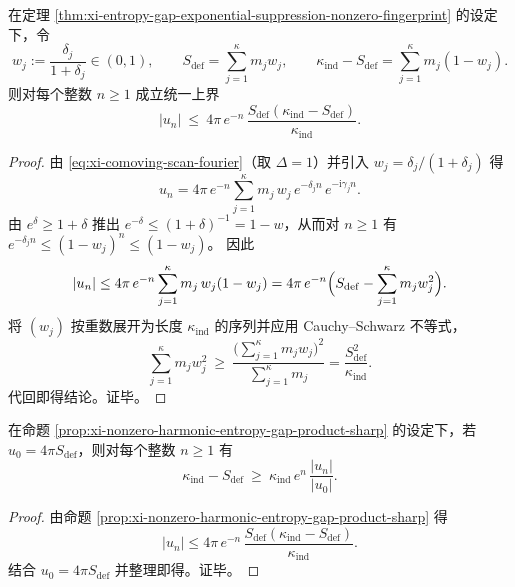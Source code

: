 \begin{proposition}[非零谐波的熵乘积锐化界]\label{prop:xi-nonzero-harmonic-entropy-gap-product-sharp}
在定理 \ref{thm:xi-entropy-gap-exponential-suppression-nonzero-fingerprint} 的设定下，令
\[
w_j:=\frac{\delta_j}{1+\delta_j}\in(0,1),
\qquad
S_{\mathrm{def}}=\sum_{j=1}^{\kappa}m_j w_j,
\qquad
\kappa_{\mathrm{ind}}-S_{\mathrm{def}}=\sum_{j=1}^{\kappa}m_j(1-w_j).
\]
则对每个整数 \(n\ge 1\) 成立统一上界
\[
|u_n|
\ \le\
4\pi\,e^{-n}\,\frac{S_{\mathrm{def}}(\kappa_{\mathrm{ind}}-S_{\mathrm{def}})}{\kappa_{\mathrm{ind}}}.
\]
\end{proposition}
\begin{proof}
由 \eqref{eq:xi-comoving-scan-fourier}（取 \(\Delta=1\)）并引入 \(w_j=\delta_j/(1+\delta_j)\) 得
\[
u_n
=4\pi\,e^{-n}\sum_{j=1}^{\kappa}m_j\,w_j\,e^{-\delta_j n}\,e^{-\mathrm{i}\gamma_j n}.
\]
由 \(e^\delta\ge 1+\delta\) 推出 \(e^{-\delta}\le (1+\delta)^{-1}=1-w\)，从而对 \(n\ge 1\) 有
\(
e^{-\delta_j n}\le (1-w_j)^n\le (1-w_j)
\)。
因此
\[
|u_n|
\le
4\pi\,e^{-n}\sum_{j=1}^{\kappa}m_j\,w_j(1-w_j)
=
4\pi\,e^{-n}\Bigl(S_{\mathrm{def}}-\sum_{j=1}^{\kappa}m_j w_j^2\Bigr).
\]
将 \((w_j)\) 按重数展开为长度 \(\kappa_{\mathrm{ind}}\) 的序列并应用 Cauchy--Schwarz 不等式，
\[
\sum_{j=1}^{\kappa}m_j w_j^2
\ \ge\
\frac{\bigl(\sum_{j=1}^{\kappa}m_j w_j\bigr)^2}{\sum_{j=1}^{\kappa}m_j}
=\frac{S_{\mathrm{def}}^2}{\kappa_{\mathrm{ind}}}.
\]
代回即得结论。证毕。
\end{proof}

\begin{corollary}[两点采样反演的熵缺口下界]\label{cor:xi-entropy-gap-lower-bound-from-two-samples}
在命题 \ref{prop:xi-nonzero-harmonic-entropy-gap-product-sharp} 的设定下，若 \(u_0=4\pi S_{\mathrm{def}}\)，则对每个整数 \(n\ge 1\) 有
\[
\kappa_{\mathrm{ind}}-S_{\mathrm{def}}
\ \ge\
\kappa_{\mathrm{ind}}\,e^{n}\,\frac{|u_n|}{|u_0|}.
\]
\end{corollary}
\begin{proof}
由命题 \ref{prop:xi-nonzero-harmonic-entropy-gap-product-sharp} 得
\[
|u_n|
\le
4\pi\,e^{-n}\,\frac{S_{\mathrm{def}}(\kappa_{\mathrm{ind}}-S_{\mathrm{def}})}{\kappa_{\mathrm{ind}}}.
\]
结合 \(u_0=4\pi S_{\mathrm{def}}\) 并整理即得。证毕。
\end{proof}

